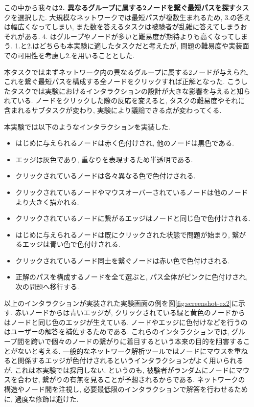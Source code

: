 \documentclass{kuee}
\begin{document}
この中から我々は{\bf 2. 異なるグループに属する2ノードを繋ぐ最短パスを探す}タスクを選択した.
大規模なネットワークでは最短パスが複数生まれるため, 3.の答えは幅広くなってしまい, また数を答えるタスクは被験者が乱雑に答えてしまうおそれがある.
4. はグループやノードが多いと難易度が期待よりも高くなってしまう.
1.と2.はどちらも本実験に適したタスクだと考えたが, 問題の難易度や実装面での可用性を考慮し2.を用いることとした.

本タスクではまずネットワーク内の異なるグループに属する2ノードが与えられ, これを繋ぐ最短パスを構成する全ノードをクリックすれば正解となった.
こうしたタスクでは実験におけるインタラクションの設計が大きな影響を与えると知られている\cite{yoghourdjian2018exploring}.
ノードをクリックした際の反応を変えると, タスクの難易度やそれに含まれるサブタスクが変わり, 実験により議論できる点が変わってくる.

本実験では以下のようなインタラクションを実装した.
\begin{itemize}
  \item はじめに与えられるノードは赤く色付けされ, 他のノードは黒色である.
  \item エッジは灰色であり, 重なりを表現するため半透明である.
  \item クリックされているノードは各々異なる色で色付けされる.
  \item クリックされているノードやマウスオーバーされているノードは他のノードより大きく描かれる.
  \item クリックされているノードに繋がるエッジはノードと同じ色で色付けされる.
  \item はじめに与えられるノードは既にクリックされた状態で問題が始まり, 繋がるエッジは青い色で色付けされる.
  \item クリックされているノード同士を繋ぐノードは赤い色で色付けされる.
  \item 正解のパスを構成するノードを全て選ぶと, パス全体がピンクに色付けされ, 次の問題へ移行する.
\end{itemize}
以上のインタラクションが実装された実験画面の例を図\ref{fig:screenshot-ex2}に示す.
赤いノードからは青いエッジが, クリックされている緑と黄色のノードからはノードと同じ色のエッジが生えている.
ノードやエッジに色付けなどを行うのはユーザーの解答を補佐するためである.
これらのインタラクションでは, グループ間を跨いで個々のノードの繋がりに着目するという本来の目的を阻害することがないと考える.
一般的なネットワーク解析ツールではノードにマウスを重ねると関係するエッジが色付けされるというインタラクションがよく用いられるが, これは本実験では採用しない.
というのも, 被験者がランダムにノードにマウスを合わせ, 繋がりの有無を見ることが予想されるからである.
ネットワークの構造やノード間を注視し, 必要最低限のインタラクションで解答を行わせるために, 過度な修飾は避けた.
\end{document}

